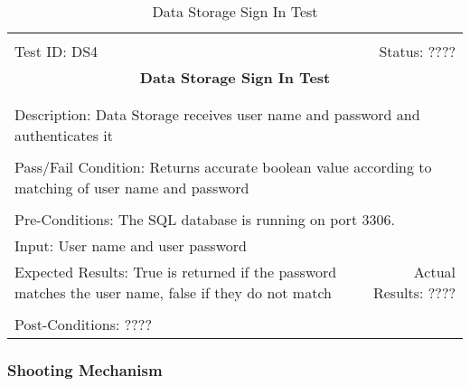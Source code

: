 \documentclass[11pt]{article}
\begin{document}
\begin{center}
\begin{table}[H]
\begin{tabular}{|l r|}\hline&\\[-2mm]
	Test ID: DS4	&Status: ????\\[-3mm]
	\multicolumn{2}{|c|}{\textbf{\large{Data Storage Sign In Test}}}\\&\\\hline&\\[-3mm]
	\multicolumn{2}{|p{\textwidth}|}{Description: Data Storage receives user name and password and authenticates it}\\[1mm]\hline&\\[-3mm]
	\multicolumn{2}{|p{\textwidth}|}{Pass/Fail Condition: Returns accurate boolean value according to matching of user name and password}\\[1mm]\hline&\\[-3mm]
	\multicolumn{2}{|p{\textwidth}|}{Pre-Conditions: The SQL database is running on port 3306.}\\[4mm]
	\multicolumn{2}{|p{\textwidth}|}{Input: User name and user password}\\[2mm]\hline
	\multicolumn{1}{|p{0.49\textwidth}}{Expected Results: True is returned if the password matches the user name, false if they do not match}	&\multicolumn{1}{|p{0.45\textwidth}|}{Actual Results: ????}\\\hline&\\[-3mm]
	\multicolumn{2}{|p{\textwidth}|}{Post-Conditions: ????}\\\hline
\end{tabular}
\caption{Data Storage Sign In Test}
\end{table}
\end{center}

\subsubsection{Shooting Mechanism}
\end{document}
